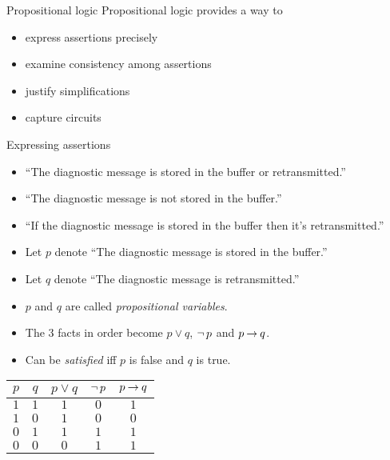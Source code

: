 \begin{wideslide}[bm=,toc=]{Propositional logic}
Propositional logic provides a way to
\begin{itemize}
\item express assertions precisely
\item examine consistency among assertions
\item justify simplifications
\item capture circuits
\end{itemize}
\end{wideslide}

\begin{wideslide}[bm=,toc=]{Expressing assertions}
\begin{itemize}
\item ``The diagnostic message is stored in the buffer or retransmitted.''
\item ``The diagnostic message is not stored in the buffer.''
\item ``If the diagnostic message is stored in the buffer then it's retransmitted.''
\item Let $p$ denote ``The diagnostic message is stored in the buffer.''
\item Let $q$ denote ``The diagnostic message is retransmitted.''
\item $p$ and $q$ are called {\em propositional variables\/}.
\item The 3 facts in order become $p\lor q$, $\mathop{\neg} p$ and $p \mathbin{\rightarrow} q$.
\item Can be {\em satisfied\/} iff $p$ is false and $q$ is true.
\end{itemize}
\begin{center}
\begin{tabular}{c|c||c|c|c}
$p$ & $q$ & $p \lor q$ & $\mathop{\neg} p$ & $p \mathbin{\rightarrow} q$ \\
\hline
$1$ & $1$ & $1$ & $0$ & $1$ \\
$1$ & $0$ & $1$ & $0$ & $0$ \\
$0$ & $1$ & $1$ & $1$ & $1$ \\
$0$ & $0$ & $0$ & $1$ & $1$ 
\end{tabular}
\end{center}


\end{wideslide}

